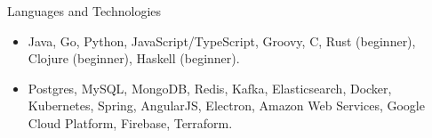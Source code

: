 \documentclass[]{cv}
\begin{document}
	\begin{cvsection}{Languages and Technologies}
		\begin{cvsubsection}{}{}{}	
			\begin{itemize}
				\item Java, Go, Python, JavaScript/TypeScript, Groovy, C, Rust (beginner), Clojure (beginner), Haskell (beginner).
				\item Postgres, MySQL, MongoDB, Redis, Kafka, Elasticsearch, Docker, Kubernetes, Spring, AngularJS, Electron, Amazon Web Services, Google Cloud Platform, Firebase, Terraform.
			\end{itemize}
		\end{cvsubsection}
	\end{cvsection}
	
\end{document}
